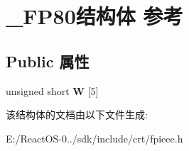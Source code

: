 \hypertarget{struct___f_p80}{}\section{\+\_\+\+F\+P80结构体 参考}
\label{struct___f_p80}
\subsection*{Public 属性}
\begin{DoxyCompactItemize}
\item 
\mbox{\label{struct___f_p80_ad8a71871c59022e8c64b8f9b2d4c6bc1}} 
unsigned short {\bfseries W} \mbox{[}5\mbox{]}
\end{DoxyCompactItemize}


该结构体的文档由以下文件生成\+:\begin{DoxyCompactItemize}
\item 
E\+:/\+React\+O\+S-\/0../sdk/include/crt/fpieee.\+h\end{DoxyCompactItemize}
